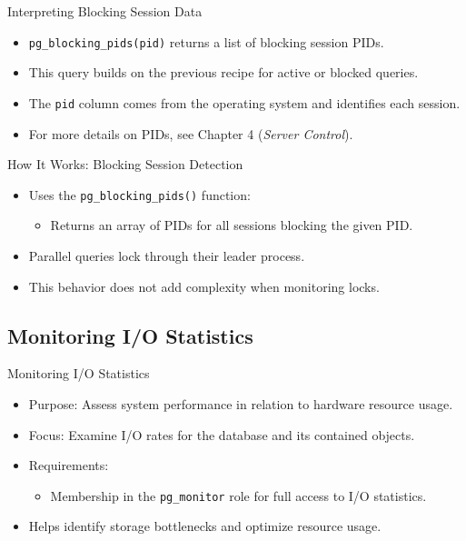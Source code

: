 \documentclass[aspectratio=169]{beamer}
\begin{document}
\begin{frame}{Interpreting Blocking Session Data}
\begin{itemize}
    \item \texttt{pg\_blocking\_pids(pid)} returns a list of blocking session PIDs.
    \item This query builds on the previous recipe for active or blocked queries.
    \item The \texttt{pid} column comes from the operating system and identifies each session.
    \item For more details on PIDs, see Chapter 4 (\textit{Server Control}).
\end{itemize}
\end{frame}

\begin{frame}{How It Works: Blocking Session Detection}
\begin{itemize}
    \item Uses the \texttt{pg\_blocking\_pids()} function:
    \begin{itemize}
        \item Returns an array of PIDs for all sessions blocking the given PID.
    \end{itemize}
    \item Parallel queries lock through their leader process.
    \item This behavior does not add complexity when monitoring locks.
\end{itemize}
\end{frame}

\subsection{Monitoring I/O Statistics}

\begin{frame}{Monitoring I/O Statistics}
\begin{itemize}
    \item Purpose: Assess system performance in relation to hardware resource usage.
    \item Focus: Examine I/O rates for the database and its contained objects.
    \item Requirements:
    \begin{itemize}
        \item Membership in the \texttt{pg\_monitor} role for full access to I/O statistics.
    \end{itemize}
    \item Helps identify storage bottlenecks and optimize resource usage.
\end{itemize}
\end{frame}
\end{document}
